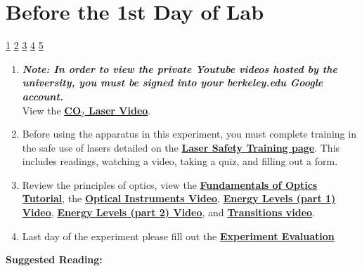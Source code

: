 \documentclass{../lab}
\begin{document}
\section{Before the 1st Day of Lab}

\signatures \hyperlink{Back Mirror Alignment}{1} \hyperlink{Proper Gas Flow}{2} \hyperlink{Spectrum Analyzer Signal Line}{3} \hyperlink{P(20) Line}{4} \hyperlink{CO$_2$ Spectrum}{5} 

\begin{enumerate}
    \item \emph{\textbf{Note: In order to view the private Youtube videos hosted by the university, you must be signed into your berkeley.edu Google account.}} \\
    View the \href{http://youtu.be/-cLSnuXGC\_U}{\textbf{CO$_2$ Laser Video}}.

    \item Before using the apparatus in this experiment, you must complete training in the safe use of lasers detailed on the \href{http://experimentationlab.berkeley.edu/lasersafety}{\textbf{\textbf{Laser Safety Training page}}}. This includes readings, watching a video, taking a quiz, and filling out a form.

    \item Review the principles of optics, view the \href{http://experimentationlab.berkeley.edu/sites/default/files/QIE/fundamental-Optics.pdf}{\textbf{Fundamentals of Optics Tutorial}}, the \href{http://youtu.be/zUGBt5vc5FA}{\textbf{Optical Instruments Video}}, \href{http://youtu.be/wyBOVjU5bBQ}{\textbf{Energy Levels (part 1) Video}}, \href{http://youtu.be/Eypw0DmVBxk}{\textbf{Energy Levels (part 2) Video}}, and \href{http://youtu.be/xOMgdVP3AfE}{\textbf{Transitions video}}.

    \item Last day of the experiment please fill out the \href{\ExperimentEvaluation}{\textbf{Experiment Evaluation}}

\end{enumerate}

\noindent\textbf{Suggested Reading:}
\end{document}
